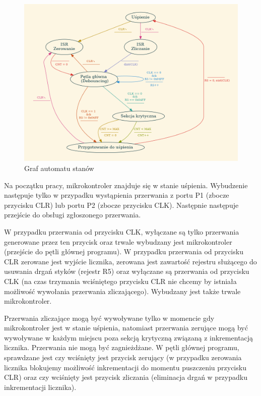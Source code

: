 \documentclass[fleqn]{article}
\begin{document}
\begin{figure}[H]
	\centering
	\includegraphics[width=\textwidth]{assets/graph.png}
	\caption{Graf automatu stanów}
	\label{fig:graph}
\end{figure}


Na początku pracy, mikrokontroler znajduje się w stanie uśpienia. Wybudzenie następuje tylko w przypadku wystąpienia przerwania z portu P1 (zbocze przycisku CLR) lub portu P2 (zbocze przycisku CLK). Następnie następuje przejście do obsługi zgłoszonego przerwania.

W przypadku przerwania od przycisku CLK, wyłączane są tylko przerwania generowane przez ten przycisk oraz trwale wybudzany jest mikrokontroler (przejście do pętli głównej programu). W przypadku przerwania od przycisku CLR zerowane jest wyjście licznika, zerowana jest zawartość rejestru służącego do usuwania drgań styków (rejestr R5) oraz wyłączane są przerwania od przycisku CLK (na czas trzymania wciśniętego przycisku CLR nie chcemy by istniała możliwość wywołania przerwania zliczającego). Wybudzany jest także trwale mikrokontroler.

Przerwania zliczające mogą być wywoływane tylko w momencie gdy mikrokontroler jest w stanie uśpienia, natomiast przerwania zerujące mogą być wywoływane w każdym miejscu poza sekcją krytyczną związaną z inkrementacją licznika. Przerwania nie mogą być zagnieżdżane. W pętli głównej programu, sprawdzane jest czy wciśnięty jest przycisk zerujący (w przypadku zerowania licznika blokujemy możliwość inkrementacji do momentu puszczeniu przycisku CLR) oraz czy wciśnięty jest przycisk zliczania (eliminacja drgań w przypadku inkrementacji licznika).
\end{document}
